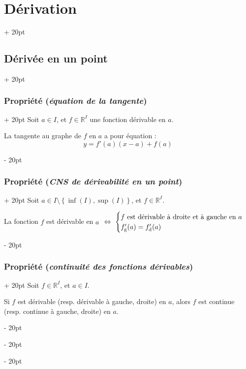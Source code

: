 \documentclass[a4paper, 12pt, twoside]{article}
\newcommand{\R}{\mathbb{R}} %
\newcommand{\set}[1]{\left\{ #1 \right\}}
\newcommand{\ssi}{\ \Leftrightarrow \ }
\newcommand{\ind}[1][20pt]{\advance\leftskip + #1}
\newcommand{\deind}[1][20pt]{\advance\leftskip - #1}
\newenvironment{indt}[2][20pt]{#2 \par \ind[#1]}{\par \deind} %
\begin{document}
\begin{indt}{\section{Dérivation}}
\begin{indt}{\subsection{Dérivée en un point}}
            \vspace{12pt}
            
            \begin{indt}{\subsubsection{Propriété (\textit{équation de la tangente})}}
                Soit $a \in I$, et $f \in \R^I$ une fonction dérivable en $a$.

                La tangente au graphe de $f$ en $a$ a pour équation :
                \[
                    y = f'(a)(x - a) + f(a)
                \]
            \end{indt}

            \vspace{12pt}
            
            \begin{indt}{\subsubsection{Propriété (\textit{CNS de dérivabilité en un point})}}
                Soit $a \in I \setminus \set{\inf(I), \sup(I)}$, et $f \in \R^I$.

                La fonction $f$ est dérivable en $a$
                $
                    \ssi
                    \begin{cases}
                        \text{$f$ est dérivable à droite et à gauche en $a$}
                        \\
                        f_{\rm g}'(a) = f_{\rm d}'(a)
                    \end{cases}
                $
            \end{indt}

            \vspace{12pt}
            
            \begin{indt}{\subsubsection{Propriété (\textit{continuité des fonctions dérivables})}}
                Soit $f \in \R^I$, et $a \in I$.

                Si $f$ est dérivable (resp. dérivable à gauche, droite) en $a$, alors $f$ est continue (resp. continue à gauche, droite) en $a$.
            \end{indt}
        \end{indt}


\end{indt}
\end{document}
